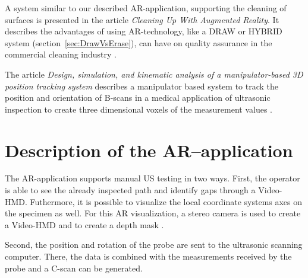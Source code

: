 \documentclass{VRARWorkshop}
\begin{document}
A system similar to our described AR-application, supporting the cleaning of surfaces is presented in the article \textit{Cleaning Up With Augmented Reality}.
It describes the advantages of using AR-technology, like a DRAW or HYBRID system (section~\ref{sec:DrawVsErase}), can have on quality assurance in the commercial cleaning industry \cite{ARClean}.

The article \textit{Design, simulation, and kinematic analysis of a manipulator-based 3D position tracking system} describes a manipulator based system to track the position and orientation of B-scans in a medical application of ultrasonic inspection to create three dimensional voxels of the measurement values \cite{fadzil_design_2015}.

\section{Description of the AR--application}
The AR-application supports manual US testing in two ways.
First, the operator is able to see the already inspected path and identify gaps through a {\sc Video-HMD}.
Futhermore, it is possible to visualize the local coordinate systems axes on the specimen as well.
For this AR visualization, a stereo camera is used to create a {\sc Video-HMD} and to create a depth mask \cite{dorner_virtual_2013}.

Second, the position and rotation of the probe are sent to the ultrasonic scanning computer.
There, the data is combined with the measurements received by the probe and a C-scan can be generated.
\end{document}
